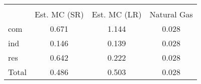 {
\def\sym#1{\ifmmode^{#1}\else\(^{#1}\)\fi}
\begin{tabular}{l*{1}{ccc}}
\hline\hline
                    &\multicolumn{3}{c}{}                  \\
                    &Est. MC (SR)&Est. MC (LR)& Natural Gas\\
\hline
com                 &       0.671&       1.144&       0.028\\
ind                 &       0.146&       0.139&       0.028\\
res                 &       0.642&       0.222&       0.028\\
Total               &       0.486&       0.503&       0.028\\
\hline\hline
\end{tabular}
}
